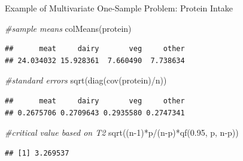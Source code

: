 \documentclass[
  ignorenonframetext,
]{beamer}
\newenvironment{Shaded}{\begin{snugshade}}{\end{snugshade}}
\newcommand{\CommentTok}[1]{\textcolor[rgb]{0.56,0.35,0.01}{\textit{#1}}}
\newcommand{\DecValTok}[1]{\textcolor[rgb]{0.00,0.00,0.81}{#1}}
\newcommand{\FloatTok}[1]{\textcolor[rgb]{0.00,0.00,0.81}{#1}}
\newcommand{\FunctionTok}[1]{\textcolor[rgb]{0.00,0.00,0.00}{#1}}
\newcommand{\NormalTok}[1]{#1}
\newcommand{\SpecialCharTok}[1]{\textcolor[rgb]{0.00,0.00,0.00}{#1}}
\begin{document}
\begin{frame}[fragile]{Example of Multivariate One-Sample Problem:
Protein Intake}
\protect\hypertarget{example-of-multivariate-one-sample-problem-protein-intake-6}{}
\tiny

\begin{Shaded}
\begin{Highlighting}[]
\CommentTok{\#sample means}
\FunctionTok{colMeans}\NormalTok{(protein)}
\end{Highlighting}
\end{Shaded}

\begin{verbatim}
##      meat     dairy       veg     other 
## 24.034032 15.928361  7.660490  7.738634
\end{verbatim}

\begin{Shaded}
\begin{Highlighting}[]
\CommentTok{\#standard errors}
\FunctionTok{sqrt}\NormalTok{(}\FunctionTok{diag}\NormalTok{(}\FunctionTok{cov}\NormalTok{(protein)}\SpecialCharTok{/}\NormalTok{n))}
\end{Highlighting}
\end{Shaded}

\begin{verbatim}
##      meat     dairy       veg     other 
## 0.2675706 0.2709643 0.2935580 0.2747341
\end{verbatim}

\begin{Shaded}
\begin{Highlighting}[]
\CommentTok{\#critical value based on T2}
\FunctionTok{sqrt}\NormalTok{((n}\DecValTok{{-}1}\NormalTok{)}\SpecialCharTok{*}\NormalTok{p}\SpecialCharTok{/}\NormalTok{(n}\SpecialCharTok{{-}}\NormalTok{p)}\SpecialCharTok{*}\FunctionTok{qf}\NormalTok{(}\FloatTok{0.95}\NormalTok{, p, n}\SpecialCharTok{{-}}\NormalTok{p))}
\end{Highlighting}
\end{Shaded}

\begin{verbatim}
## [1] 3.269537
\end{verbatim}


\end{frame}
\end{document}
